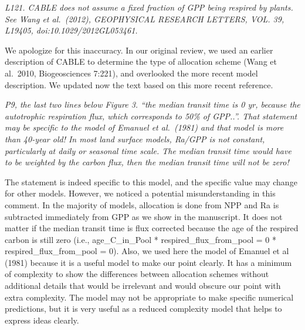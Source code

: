 \emph{L121. CABLE does not assume a fixed fraction of GPP being respired
by plants. See Wang et al.~(2012), GEOPHYSICAL RESEARCH LETTERS, VOL.
39, L19405, doi:10.1029/2012GL053461.}

We apologize for this inaccuracy. In our original review, we used an
earlier description of CABLE to determine the type of allocation scheme
(Wang et al.~2010, Biogeosciences 7:221), and overlooked the more recent
model description. We updated now the text based on this more recent
reference.

\emph{P9, the last two lines below Figure 3. ``the median transit time
is 0 yr, because the autotrophic respiration flux, which corresponds to
50\% of GPP..''. That statement may be specific to the model of Emanuel
et al.~(1981) and that model is more than 40-year old! In most land
surface models, Ra/GPP is not constant, particularly at daily or
seasonal time scale. The median transit time would have to be weighted
by the carbon flux, then the median transit time will not be zero!}

The statement is indeed specific to this model, and the specific value
may change for other models. However, we noticed a potential
misunderstanding in this comment. In the majority of models, allocation
is done from NPP and Ra is subtracted immediately from GPP as we show in
the manuscript. It does not matter if the median transit time is flux
corrected because the age of the respired carbon is still zero (i.e.,
age\_C\_in\_Pool * respired\_flux\_from\_pool = 0 *
respired\_flux\_from\_pool = 0). Also, we used here the model of Emanuel
et al (1981) because it is a useful model to make our point clearly. It
has a minimum of complexity to show the differences between allocation
schemes without additional details that would be irrelevant and would
obscure our point with extra complexity. The model may not be
appropriate to make specific numerical predictions, but it is very
useful as a reduced complexity model that helps to express ideas
clearly.

%
